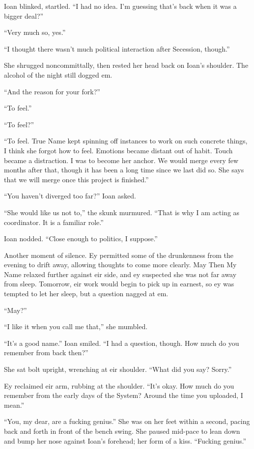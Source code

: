 Ioan blinked, startled. ``I had no idea. I'm guessing that's back when it was a bigger deal?''

``Very much so, yes.''

``I thought there wasn't much political interaction after Secession, though.''

She shrugged noncommittally, then rested her head back on Ioan's shoulder. The alcohol of the night still dogged em.

``And the reason for your fork?''

``To feel.''

``To feel?''

``To feel. True Name kept spinning off instances to work on such concrete things, I think she forgot how to feel. Emotions became distant out of habit. Touch became a distraction. I was to become her anchor. We would merge every few months after that, though it has been a long time since we last did so. She says that we will merge once this project is finished.''

``You haven't diverged too far?'' Ioan asked.

``She would like us not to,'' the skunk murmured. ``That is why I am acting as coordinator. It is a familiar role.''

Ioan nodded. ``Close enough to politics, I suppose.''

Another moment of silence. Ey permitted some of the drunkenness from the evening to drift away, allowing thoughts to come more clearly. May Then My Name relaxed further against eir side, and ey suspected she was not far away from sleep. Tomorrow, eir work would begin to pick up in earnest, so ey was tempted to let her sleep, but a question nagged at em.

``May?''

``I like it when you call me that,'' she mumbled.

``It's a good name.'' Ioan smiled. ``I had a question, though. How much do you remember from back then?''

She sat bolt upright, wrenching at eir shoulder. ``What did you say? Sorry.''

Ey reclaimed eir arm, rubbing at the shoulder. ``It's okay. How much do you remember from the early days of the System? Around the time you uploaded, I mean.''

``You, my dear, are a fucking genius.'' She was on her feet within a second, pacing back and forth in front of the bench swing. She paused mid-pace to lean down and bump her nose against Ioan's forehead; her form of a kiss. ``Fucking genius.''

